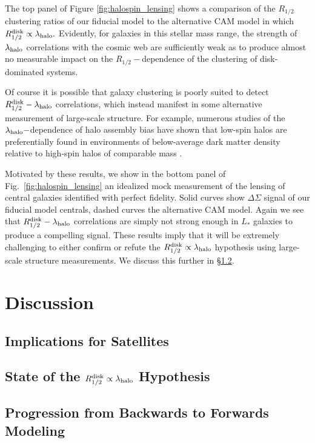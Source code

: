 \documentclass[usenatbib,usegraphicx,letterpaper]{mn2e}
\newcommand{\rhalf}{R_{1/2}}
\newcommand{\rhalfdisk}{R_{1/2}^{\rm disk}}
\newcommand{\halospin}{\lambda_{\rm halo}}
\begin{document}
The top panel of Figure \ref{fig:halospin_lensing} shows a comparison of the $\rhalf$ clustering ratios of our fiducial model to the alternative CAM model in which $\rhalfdisk\propto\halospin.$ Evidently, for galaxies in this stellar mass range, the strength of $\halospin$ correlations with the cosmic web are sufficiently weak as to produce almost no measurable impact on the $\rhalf-$dependence of the clustering of disk-dominated systems.

Of course it is possible that galaxy clustering is poorly suited to detect $\rhalfdisk-\halospin$ correlations, which instead manifest in some alternative measurement of large-scale structure. For example, numerous studies of the $\halospin-$dependence of halo assembly bias have shown that low-spin halos are preferentially found in environments of below-average dark matter density relative to high-spin halos of comparable mass \citep[see, for example,][]{lee_etal17}.

Motivated by these results, we show in the bottom panel of Fig.~\ref{fig:halospin_lensing} an idealized mock measurement of the lensing of central galaxies identified with perfect fidelity. Solid curves show $\Delta\Sigma$ signal of our fiducial model centrals, dashed curves the alternative CAM model. Again we see that $\rhalfdisk-\halospin$ correlations are simply not strong enough in $L_\ast$ galaxies to produce a compelling signal. These results imply that it will be extremely challenging to either confirm or refute the $\rhalfdisk\propto\halospin$ hypothesis using large-scale structure measurements. We discuss this further in \S\ref{subsec:mo_status}.


\section{Discussion}
\label{sec:discussion}


\subsection{Implications for Satellites}
\label{subsec:satellite_discussion}

\subsection{State of the $\rhalfdisk\propto\halospin$ Hypothesis}
\label{subsec:mo_status}

\subsection{Progression from Backwards to Forwards Modeling}
\label{subsec:forwardsmodeling}
\end{document}
